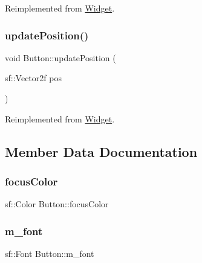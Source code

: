 Reimplemented from \mbox{\hyperlink{class_widget_aef48b79ed822a3ad4e5a2b719e57f350}{Widget}}.

\mbox{\label{class_button_a5e814220d9d44922eedded14d5511493}} 
\subsubsection{\texorpdfstring{updatePosition()}{updatePosition()}}
{\footnotesize\ttfamily void Button\+::update\+Position (\begin{DoxyParamCaption}\item[{sf\+::\+Vector2f}]{pos }\end{DoxyParamCaption})\hspace{0.3cm}{\ttfamily [virtual]}}



Reimplemented from \mbox{\hyperlink{class_widget_a49b72dfbd65f07a616d6e33b04675b9a}{Widget}}.



\subsection{Member Data Documentation}
\mbox{\label{class_button_aafa8a827288ccc7413b4e94124dba2a1}} 
\subsubsection{\texorpdfstring{focusColor}{focusColor}}
{\footnotesize\ttfamily sf\+::\+Color Button\+::focus\+Color\hspace{0.3cm}{\ttfamily [protected]}}

\mbox{\label{class_button_a40795cda9f045088af44fda67977722a}} 
\subsubsection{\texorpdfstring{m\_font}{m\_font}}
{\footnotesize\ttfamily sf\+::\+Font Button\+::m\+\_\+font\hspace{0.3cm}{\ttfamily [protected]}}

\mbox{\label{class_button_a209498deead9cc94c21a79416938268a}} 

